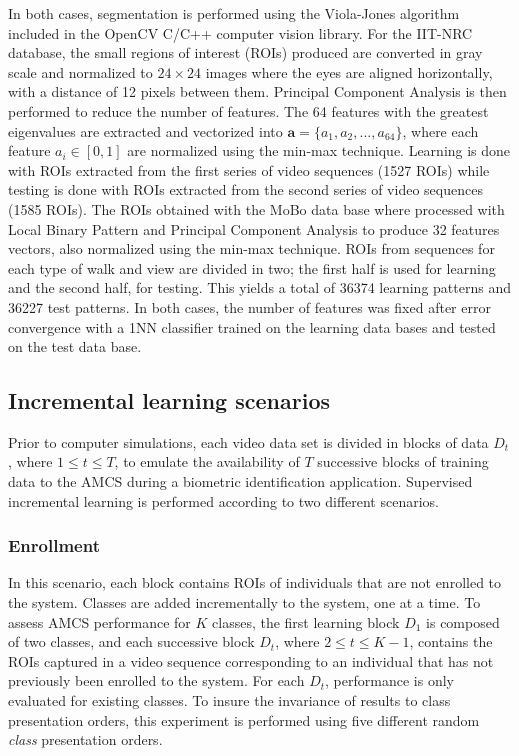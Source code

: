 In both cases, segmentation is performed using the Viola-Jones algorithm included in the OpenCV C/C++ computer vision library.
For the IIT-NRC database, the small regions of interest (ROIs) produced are converted in gray scale and normalized to $24\times24$ images where the eyes are aligned horizontally, with a distance of 12 pixels between them.
Principal Component Analysis is then performed to reduce the number of features.
The 64 features with the greatest eigenvalues are extracted and vectorized into $\textbf{a} = \{a_1, a_2, ..., a_{64}\}$, where each feature $a_i \in [0,1]$ are normalized using the min-max technique.
Learning is done with ROIs extracted from the first series of video sequences (1527 ROIs) while testing is done with ROIs extracted from the second series of video sequences (1585 ROIs).
The ROIs obtained with the MoBo data base where processed with Local Binary Pattern and Principal Component Analysis to produce 32 features vectors, also normalized using the min-max technique.
ROIs from sequences for each type of walk and view are divided in two; the first half is used for learning and the second half, for testing.
This yields a total of 36374 learning patterns and 36227 test patterns.
In both cases, the number of features was fixed after error convergence with a 1NN classifier trained on the learning data bases and tested on the test data base.

\subsection{Incremental learning scenarios}
\label{sec:c2_scenario}

Prior to computer simulations, each video data set is divided in blocks of data $D_t$, where $1\leq t\leq T$, to emulate the availability of $T$ successive blocks of training data to the AMCS during a biometric identification application.
Supervised incremental learning is performed according to two different scenarios.

\subsubsection{Enrollment}

In this scenario, each block contains ROIs of individuals that are not enrolled to the system.
Classes are added incrementally to the system, one at a time.
To assess AMCS performance for $K$ classes, the first learning block $D_1$ is composed of two classes, and each successive block $D_t$, where $2 \leq t \leq K-1$, contains the ROIs captured in a video sequence corresponding to an individual that has not previously been enrolled to the system.
For each $D_t$, performance is only evaluated for existing classes.
To insure the invariance of results to class presentation orders, this experiment is performed using five different random \emph{class} presentation orders.

